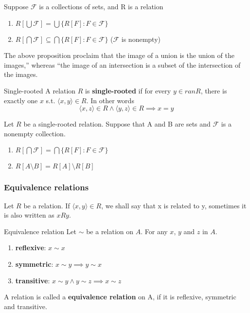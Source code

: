 \begin{proposition}{}{}
    Suppose $\mathcal{F}$ is a collections of sets, and R is a relation
    \begin{enumerate}

        \item $R[\bigcup \mathcal{F}] = \bigcup \{R[F] : F \in \mathcal{F}\}$
        \item $R[\bigcap \mathcal{F}] \subseteq \bigcap \{R[F] : F \in \mathcal{F}\}$ ($\mathcal{F}$ is nonempty)

    \end{enumerate}
\end{proposition}
The above proposition proclaim that the image of a union is the union of the images,” whereas “the image of an intersection is a subset of the intersection of the images.

\begin{definition}{Single-rooted}{}
    A relation $R$ is \textbf{single-rooted} if for every $y \in ran R$, there is exactly one $x$ s.t. $\langle x,y \rangle \in R$. In other words
    \begin{equation*}
        \langle x,z \rangle \in R \land \langle y,z \rangle \in R \implies x = y
    \end{equation*}
\end{definition}

\begin{corollary}{}{}
    Let $R$ be a single-rooted relation. Suppose that A and B are sets and $\mathcal{F}$ is a nonempty collection.
    \begin{enumerate}

        \item $R[\bigcap \mathcal{F}] = \bigcap \{R[F] : F \in \mathcal{F}\}$ 
        \item $R[A \setminus B] = R[A] \setminus R[B]$

    \end{enumerate}
\end{corollary}

\subsubsection{Equivalence relations}
Let $R$ be a relation. If $\langle x,y \rangle \in R$, we shall say that x is related to y, sometimes it is also written as $xRy$. 

\begin{definition}{Equivalence relation}{}
    Let $\sim$ be a relation on $A$. For any $x$, $y$ and $z$ in $A$.
    \begin{enumerate}

        \item \textbf{reflexive}: $x \sim x$
        \item \textbf{symmetric}: $x \sim y \implies y \sim x$
        \item \textbf{transitive}: $x \sim y \land y \sim z \implies x \sim z$

    \end{enumerate}
    A relation is called a \textbf{equivalence relation} on A, if it is reflexive, symmetric and transitive.
\end{definition}

